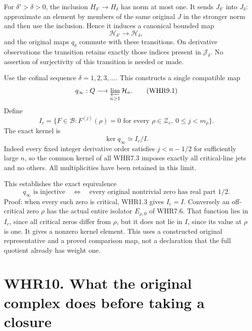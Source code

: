 For \(\delta'>\delta>0\), the inclusion \(H_{\delta'}\to H_\delta\) has
norm at most one. It sends \(J_{\delta'}\) into \(J_\delta\):
approximate an element by members of the same original \(J\) in the
stronger norm and then use the inclusion. Hence it induces a canonical
bounded map \[
 \mathcal H_{\delta'}\longrightarrow\mathcal H_\delta,
\] and the original maps \(q_\delta\) commute with these transitions. On
derivative observations the transition retains exactly those indices
present in \(\mathscr J_\delta\). No assertion of surjectivity of this
transition is needed or made.

Use the cofinal sequence \(\delta=1,2,3,\ldots\). This constructs a
single compatible map \[
 q_\infty:Q\longrightarrow\varprojlim_{n\geq1}\mathcal H_n.
 \tag{WHR9.1}
\] Define \[
 I_c=\{F\in\mathcal B:F^{(j)}(\rho)=0
        \text{ for every }\rho\in\mathscr Z_c,
                   \ 0\leq j<m_\rho\}.
\] The exact kernel is \[
 \boxed{\ker q_\infty\simeq I_c/I.}
 \tag{WHR9.2}
\] Indeed every fixed integer derivative order satisfies \(j<n-1/2\) for
sufficiently large \(n\), so the common kernel of all WHR7.3 imposes
exactly all critical-line jets and no others. All multiplicities have
been retained in this limit.

This establishes the exact equivalence \[
 \boxed{q_\infty\text{ is injective}\quad\Longleftrightarrow\quad
    \text{every original nontrivial zero has real part }1/2.}
 \tag{WHR9.3}
\] Proof: when every such zero is critical, WHR1.3 gives \(I_c=I\).
Conversely an off-critical zero \(\rho\) has the actual entire isolator
\(E_{\rho,0}\) of WHR7.6. That function lies in \(I_c\), since all
critical zeros differ from \(\rho\), but it does not lie in \(I\), since
its value at \(\rho\) is one. It gives a nonzero kernel element. This
uses a constructed original representative and a proved comparison map,
not a declaration that the full quotient already has weight one.

\section{WHR10. What the original complex does before taking a
closure}\label{whr10.-what-the-original-complex-does-before-taking-a-closure}

